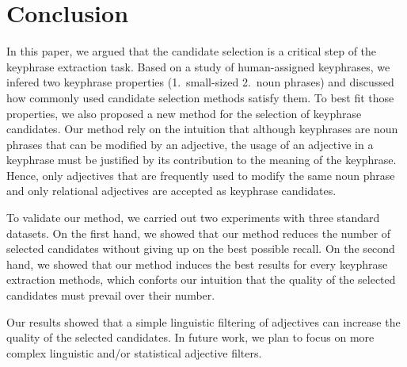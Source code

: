 \section{Conclusion}
\label{sec:conclusion}
  In this paper, we argued that the candidate selection is a critical step of
  the keyphrase extraction task. Based on a study of human-assigned keyphrases,
  we infered two keyphrase properties (1.~small-sized 2.~noun phrases) and
  discussed how commonly used candidate selection methods satisfy them. To best
  fit those properties, we also proposed a new method for the selection of
  keyphrase candidates. Our method rely on the intuition that although
  keyphrases are noun phrases that can be modified by an adjective, the usage of
  an adjective in a keyphrase must be justified by its contribution to the
  meaning of the keyphrase. Hence, only adjectives that are frequently used to
  modify the same noun phrase and only relational adjectives are accepted as
  keyphrase candidates.

  To validate our method, we carried out two experiments with three standard
  datasets. On the first hand, we showed that our method reduces the number of
  selected candidates without giving up on the best possible recall. On the
  second hand, we showed that our method induces the best results for every
  keyphrase extraction methods, which conforts our intuition that the quality of
  the selected candidates must prevail over their number.

  Our results showed that a simple linguistic filtering of adjectives can
  increase the quality of the selected candidates. In future work, we plan to
  focus on more complex linguistic and/or statistical adjective filters.


